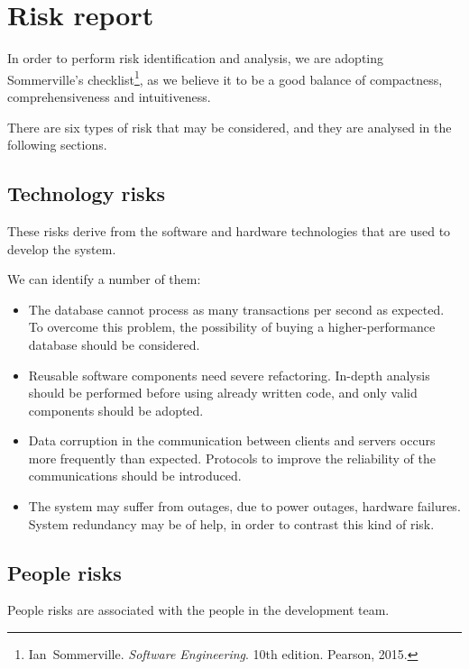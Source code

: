 \chapter{Risk report}\label{chap:risk}

In order to perform risk identification and analysis, we are adopting Sommerville's checklist\footnote{Ian~Sommerville. \emph{Software Engineering}. 10th edition. Pearson, 2015.}, as we believe it to be a good balance of compactness, comprehensiveness and intuitiveness. 

There are six types of risk that may be considered, and they are analysed in the following sections.





\section{Technology risks}

These risks derive from the software and hardware technologies that are used to develop the system. 

We can identify a number of them:
\begin{itemize}
	\item The database cannot process as many transactions per second as expected. To overcome this problem, the possibility of buying a higher-performance database should be considered.
	\item Reusable software components need severe refactoring. In-depth analysis should be performed before using already written code, and only valid components should be adopted.
	\item Data corruption in the communication between clients and servers occurs more frequently than expected. Protocols to improve the reliability of the communications should be introduced.
	\item The system may suffer from outages, due to power outages, hardware failures. System redundancy may be of help, in order to contrast this kind of risk.

\end{itemize}








\section{People risks}

People risks are associated with the people in the development team.

